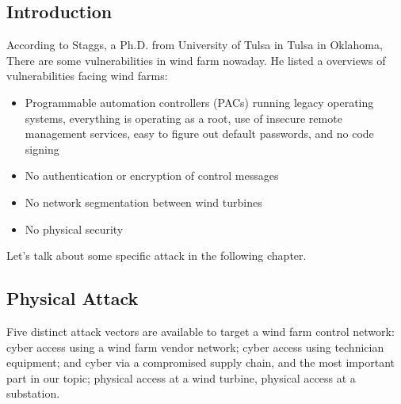 \documentclass[twosided,a4,10pt]{article}
\begin{document}
\begin{multicols}{2}
\subsection{Introduction}
 According to Staggs, a Ph.D. from University of Tulsa in Tulsa in Oklahoma, There are some vulnerabilities in wind farm nowaday. He listed a overviews of vulnerabilities facing wind farms:
 \begin{itemize}
     \item Programmable automation controllers (PACs) running legacy operating systems, everything is operating as a root, use of insecure remote management services, easy to figure out default passwords, and no code signing
    \item	No authentication or encryption of control messages
    \item	No network segmentation between wind turbines
    \item	No physical security
 \end{itemize}
 Let's talk about some specific attack in the following chapter.


\subsection{Physical Attack}
Five distinct attack vectors are available to target a wind farm control network: cyber access using a wind farm vendor network; cyber access using technician equipment; and cyber via a compromised supply chain, and the most important part in our topic; physical access at a wind turbine, physical access at a substation.

\end{multicols}
\end{document}
